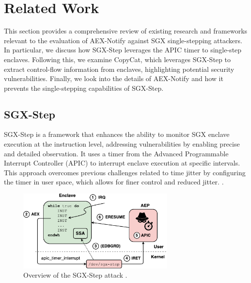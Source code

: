 \documentclass{llncs}
\begin{document}
\section{Related Work}

This section provides a comprehensive review of existing research and frameworks
relevant to the evaluation of AEX-Notify against SGX single-stepping attackers.
In particular, we discuss how SGX-Step leverages the APIC timer to single-step enclaves.
Following this, we examine CopyCat, which leverages SGX-Step to extract
control-flow information from enclaves, highlighting potential security
vulnerabilities.
Finally, we look into the details of AEX-Notify and
how it prevents the single-stepping capabilities of SGX-Step.

\subsection{SGX-Step}

SGX-Step \cite{BulckPS17} is a framework that enhances the ability to
monitor SGX enclave execution at the instruction level,
addressing vulnerabilities by enabling precise and detailed observation.
It uses a timer from the Advanced Programmable Interrupt Controller (APIC) to interrupt enclave execution at specific intervals. This approach overcomes previous challenges related to time jitter by configuring the timer in user space, which allows for finer control and reduced jitter. \cite{ArnautovTGKMPLM16}.

\begin{figure}[t!]
  \centering
  \includegraphics[width=0.7\textwidth]{images/sgx-step-overview.pdf}
  \caption{Overview of the SGX-Step attack \cite{BulckPS17}.}
  \label{fig:sgx-step}
\end{figure}
\end{document}
